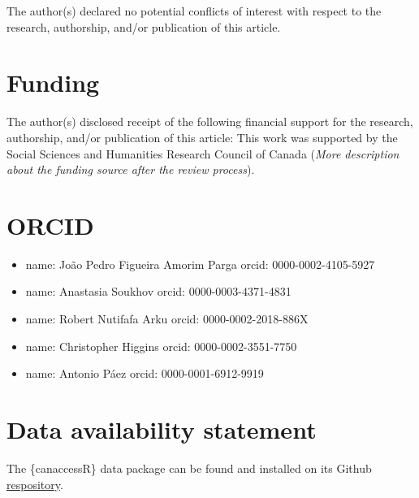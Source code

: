 \documentclass[Royal,times,sageh]{sagej}
\providecommand{\tightlist}{%
  \setlength{\itemsep}{0pt}\setlength{\parskip}{0pt}}
\begin{document}
The author(s) declared no potential conflicts of interest with respect
to the research, authorship, and/or publication of this article.

\section{Funding}\label{funding}

The author(s) disclosed receipt of the following financial support for
the research, authorship, and/or publication of this article: This work
was supported by the Social Sciences and Humanities Research Council of
Canada (\emph{More description about the funding source after the review
process}).

\section{ORCID}\label{orcid}

\begin{itemize}
\tightlist
\item
  name: João Pedro Figueira Amorim Parga orcid: 0000-0002-4105-5927
\item
  name: Anastasia Soukhov orcid: 0000-0003-4371-4831
\item
  name: Robert Nutifafa Arku orcid: 0000-0002-2018-886X
\item
  name: Christopher Higgins orcid: 0000-0002-3551-7750
\item
  name: Antonio Páez orcid: 0000-0001-6912-9919
\end{itemize}

\section{Data availability statement}\label{data-availability-statement}

The \{canaccessR\} data package can be found and installed on its Github
\href{https://github.com/paezha/canaccessR}{respository}.



\end{document}
